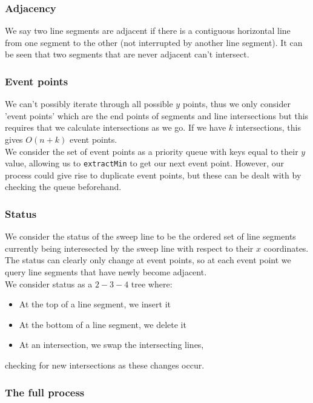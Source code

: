 \documentclass[a4paper, 12pt, twoside]{article}
\begin{document}
\subsubsection{Adjacency} 
We say two line segments are adjacent if there is a
contiguous horizontal line from one segment to the other (not interrupted
by another line segment). It can be
seen that two segments that are never adjacent can't intersect.

\subsubsection{Event points} 
We can't possibly iterate through all possible $y$
points, thus we only consider 'event points' which are the end points of 
segments and line intersections but this requires that we calculate 
intersections as we go. If we have $k$ intersections,
this gives $O(n + k)$ event points.
\\[\baselineskip]
We consider the set of event points as a priority queue with keys 
equal to their $y$ value, allowing us to \texttt{extractMin} to get
our next event point. However, our process could give rise to duplicate
event points, but these can be dealt with by checking the queue beforehand.

\subsubsection{Status} 
We consider the status of the sweep line to be the
ordered set of line segments currently being interesected by the sweep line
with respect to their $x$ coordinates. The status can clearly only change
at event points, so at each event point we query line segments that have
newly become adjacent.
\\[\baselineskip]
We consider status as a $2-3-4$ tree where: \begin{itemize}
  \item At the top of a line segment, we insert it
  \item At the bottom of a line segment, we delete it
  \item At an intersection, we swap the intersecting lines,
\end{itemize} checking for new intersections as these changes occur.

\subsubsection{The full process}
\end{document}
